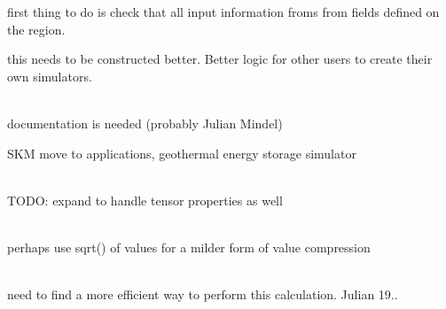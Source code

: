 \begin{DoxyRefList}
\label{todo__todo000212}%
%


\label{todo__todo000213}%
%
first thing to do is check that all input information froms from fields defined on the region. 

\label{todo__todo000214}%
%
this needs to be constructed better. Better logic for other users to create their own simulators.  
\item[Struct \doxylink{structcsmp_1_1_simulator_setup_parameter}{csmp\+::Simulator\+Setup\+Parameter} ]\hfill \\
\label{todo__todo000218}%
%
documentation is needed (probably Julian Mindel)

\label{todo__todo000219}%
%
SKM move to applications, geothermal energy storage simulator  
\item[Member \doxylink{classcsmp_1_1_s_k_u_a___interface_a8a473017fb0298d15b2052d08426a12b}{csmp\+::SKUA\+\_\+\+Interface\+::Import\+Element\+Property\+Values\+From\+SKUA} (\doxylink{classcsmp_1_1_model}{Model$<$ dim $>$} \&, const std\+::string \&data\+\_\+file=std\+::string())]\hfill \\
\label{todo__todo000125}%
%
TODO\+: expand to handle tensor properties as well 
\item[Member \doxylink{namespacecsmp_aae3141ff59920b4f43a7b2aaaa17fa31}{csmp\+::smooth\+Element\+Data} (\doxylink{classcsmp_1_1_model}{Model$<$ dim $>$} \&model, const std\+::string \&region\+\_\+to\+\_\+be\+\_\+smoothed, const std\+::string \&variable\+\_\+name, int number\+\_\+of\+\_\+smoothing\+\_\+cycles, bool log10\+\_\+smoothing, bool in\+\_\+plane\+\_\+smoothing, bool output\+\_\+model\+\_\+to\+\_\+binary)]\hfill \\
\label{todo__todo000195}%
%
perhaps use sqrt() of values for a milder form of value compression  
\item[Member \doxylink{classcsmp_1_1_source_visitor_a67fe3a5000d3979d5a788d249ac529d7}{csmp\+::Source\+Visitor\texorpdfstring{$<$}{<} dim \texorpdfstring{$>$}{>}\+::Visit} (\doxylink{classcsmp_1_1_element}{Element$<$ dim $>$} \texorpdfstring{$\ast$}{*})]\hfill \\
\label{todo__todo000223}%
%
need to find a more efficient way to perform this calculation. Julian 19..  
\item[Member \doxylink{classcsmp_1_1_split_boundary_interface_a85db4d8207a4baec857b7352926900a2}{csmp\+::Split\+Boundary\+Interface\texorpdfstring{$<$}{<} dim, SPLITBOUNDARY\+\_\+\+COMPLEX \texorpdfstring{$>$}{>}\+::Remove\+Split\+Boundary} (const char \texorpdfstring{$\ast$}{*}split\+\_\+boundary, bool erase\+\_\+interfaces)]\hfill \\

\end{DoxyRefList}
